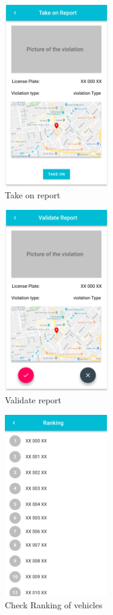 \documentclass{article}
\begin{document}
\clearpage
\begin{figure}[!htb]
		\centering
		\includegraphics[height=7.9cm,keepaspectratio]{images/mockups/Report_Open_detail.png}
		\caption{Take on report}
\end{figure}

\begin{figure}[!htb]
		\centering
		\includegraphics[height=7.9cm,keepaspectratio]{images/mockups/Report_Open_detail_took_on.png}
		\caption{Validate report}
\end{figure}

\clearpage
\begin{figure}[!htb]
		\centering
		\includegraphics[height=7.9cm,keepaspectratio]{images/mockups/Ranking.png}
		\caption{Check Ranking of vehicles}
\end{figure}
\end{document}
